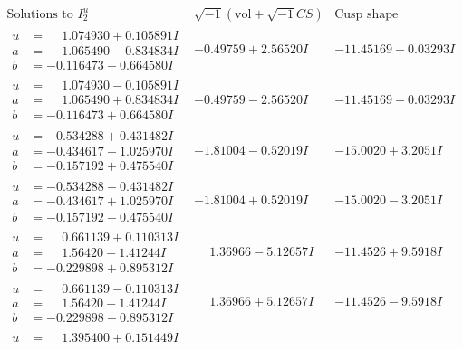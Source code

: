 \documentclass[1p]{elsarticle_modified}
\theoremstyle{definition}
\newcommand{\I}{\sqrt{-1}}
\begin{document}
$$\begin{array}{c|c|c}  
\text{Solutions to }I^u_{2}& \I (\text{vol} + \sqrt{-1}CS) & \text{Cusp shape}\\
 \hline 
\begin{aligned}
u &= \phantom{-}1.074930 + 0.105891 I \\
a &= \phantom{-}1.065490 - 0.834834 I \\
b &= -0.116473 - 0.664580 I\end{aligned}
 & -0.49759 + 2.56520 I & -11.45169 - 0.03293 I \\ \hline\begin{aligned}
u &= \phantom{-}1.074930 - 0.105891 I \\
a &= \phantom{-}1.065490 + 0.834834 I \\
b &= -0.116473 + 0.664580 I\end{aligned}
 & -0.49759 - 2.56520 I & -11.45169 + 0.03293 I \\ \hline\begin{aligned}
u &= -0.534288 + 0.431482 I \\
a &= -0.434617 - 1.025970 I \\
b &= -0.157192 + 0.475540 I\end{aligned}
 & -1.81004 - 0.52019 I & -15.0020 + 3.2051 I \\ \hline\begin{aligned}
u &= -0.534288 - 0.431482 I \\
a &= -0.434617 + 1.025970 I \\
b &= -0.157192 - 0.475540 I\end{aligned}
 & -1.81004 + 0.52019 I & -15.0020 - 3.2051 I \\ \hline\begin{aligned}
u &= \phantom{-}0.661139 + 0.110313 I \\
a &= \phantom{-}1.56420 + 1.41244 I \\
b &= -0.229898 + 0.895312 I\end{aligned}
 & \phantom{-}1.36966 - 5.12657 I & -11.4526 + 9.5918 I \\ \hline\begin{aligned}
u &= \phantom{-}0.661139 - 0.110313 I \\
a &= \phantom{-}1.56420 - 1.41244 I \\
b &= -0.229898 - 0.895312 I\end{aligned}
 & \phantom{-}1.36966 + 5.12657 I & -11.4526 - 9.5918 I \\ \hline\begin{aligned}
u &= \phantom{-}1.395400 + 0.151449 I \\

\end{aligned}
\end{array}$$
\end{document}
